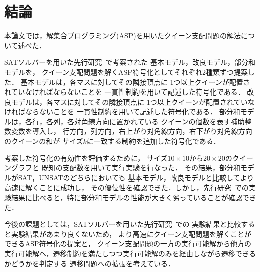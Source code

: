 \chapter{結論}\label{chap:conclusion}

本論文では，解集合プログラミング(ASP)を用いたクイーン支配問題の解法について述べた．

SATソルバーを用いた先行研究~\cite{yamamoto21}で考案された
基本モデル，改良モデル，部分和モデルを，
クイーン支配問題を解くASP符号化としてそれぞれ2種類ずつ提案した．
基本モデルは，各マスに対してその隣接頂点に
1つ以上クイーンが配置されていなければならないことを
一貫性制約を用いて記述した符号化である．
改良モデルは，各マスに対してその隣接頂点に
1つ以上クイーンが配置されていなければならないことを
一貫性制約を用いて記述した符号化である．
部分和モデルは，各行，各列，各対角線方向に置かれている
クイーンの個数を表す補助整数変数を導入し，
行方向，列方向，右上がり対角線方向，右下がり対角線方向のクイーンの和が
サイズ$k$に一致する制約を追加した符号化である．

考案した符号化の有効性を評価するために，
サイズ$10 \times 10$から$20 \times 20$のクイーングラフと
既知の支配数を用いて実行実験を行なった．
その結果，部分和モデルがSAT，UNSATのどちらにおいても
基本モデル，改良モデルと比較してより高速に解くことに成功し，
その優位性を確認できた．しかし，先行研究~\cite{yamamoto21}での実験結果に比べると，特に部分和モデルの性能が大きく劣っていることが確認できた．

今後の課題としては，SATソルバーを用いた先行研究~\cite{yamamoto21}での
実験結果と比較すると実験結果があまり良くないため，
より高速にクイーン支配問題を解くことができるASP符号化の提案と，
クイーン支配問題の一方の実行可能解から他方の実行可能解へ，遷移制約を満たしつつ実行可能解のみを経由しながら遷移できるかどうかを判定する
遷移問題への拡張を考えている．